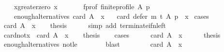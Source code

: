 \begin{isabellebody}
\ \ \ \ x{\isacharunderscore}{\kern0pt}greater{\isacharunderscore}{\kern0pt}zero{\isacharcolon}{\kern0pt}\ {\isachardoublequoteopen}x\ {\isachargreater}{\kern0pt}\ {}{\isachardoublequoteclose}\ \isanewline
\ \ \ \ f{\isacharunderscore}{\kern0pt}prof{\isacharcolon}{\kern0pt}\ {\isachardoublequoteopen}finite{\isacharunderscore}{\kern0pt}profile\ A\ p{\isachardoublequoteclose}\ \isanewline
\ \ \ \ enough{\isacharunderscore}{\kern0pt}alternatives{\isacharcolon}{\kern0pt}\ {\isachardoublequoteopen}card\ A\ {\isasymge}\ x{\isachardoublequoteclose}\isanewline
\ \ \ {\isachardoublequoteopen}card\ {\isacharparenleft}{\kern0pt}defer\ {\isacharparenleft}{\kern0pt}m\ {\isasymcirclearrowleft}\isactrlsub t{\isacharparenright}{\kern0pt}\ A\ p{\isacharparenright}{\kern0pt}\ {\isacharequal}{\kern0pt}\ x{\isachardoublequoteclose}\isanewline
%
\isadelimproof
%
\endisadelimproof
%
\isatagproof
{}\isamarkupfalse%
\ cases\isanewline
\ \ \isamarkupfalse%
\ {\isachardoublequoteopen}card\ A\ {\isacharequal}{\kern0pt}\ x{\isachardoublequoteclose}\isanewline
\ \ \isamarkupfalse%
\ {\isacharquery}{\kern0pt}thesis\isanewline
\ \ \ \ \isamarkupfalse%
\ {\isacharparenleft}{\kern0pt}simp\ add{\isacharcolon}{\kern0pt}\ terminate{\isacharunderscore}{\kern0pt}if{\isacharunderscore}{\kern0pt}n{\isacharunderscore}{\kern0pt}left{\isacharparenright}{\kern0pt}\isanewline
{}\isamarkupfalse%
\isanewline
\ \ \isamarkupfalse%
\ card{\isacharunderscore}{\kern0pt}not{\isacharunderscore}{\kern0pt}x{\isacharcolon}{\kern0pt}\ {\isachardoublequoteopen}{\isasymnot}\ card\ A\ {\isacharequal}{\kern0pt}\ x{\isachardoublequoteclose}\isanewline
\ \ \isamarkupfalse%
\ {\isacharquery}{\kern0pt}thesis\isanewline
\ \ \isamarkupfalse%
\ cases\isanewline
\ \ \ \ \isamarkupfalse%
\ {\isachardoublequoteopen}card\ A\ {\isacharless}{\kern0pt}\ x{\isachardoublequoteclose}\isanewline
\ \ \ \ \isamarkupfalse%
\ {\isacharquery}{\kern0pt}thesis\isanewline
\ \ \ \ \ \ \isamarkupfalse%
\ enough{\isacharunderscore}{\kern0pt}alternatives\ not{\isacharunderscore}{\kern0pt}le\isanewline
\ \ \ \ \ \ \isamarkupfalse%
\ blast\isanewline
\ \ \isamarkupfalse%
\isanewline
\ \ \ \ \isamarkupfalse%
\ {\isachardoublequoteopen}{\isasymnot}card\ A\ {\isacharless}{\kern0pt}\ x{\isachardoublequoteclose}\isanewline
\ \ \ \ \isamarkupfalse%

\end{isabellebody}
